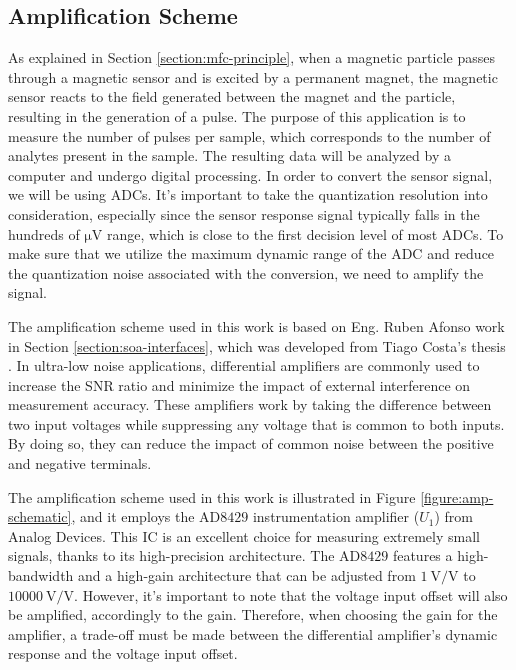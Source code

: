 \subsection{Amplification Scheme}

As explained in Section \ref{section:mfc-principle}, when a magnetic particle passes through a magnetic sensor and is excited by a permanent magnet, the magnetic sensor reacts to the field generated between the magnet and the particle, resulting in the generation of a pulse. The purpose of this application is to measure the number of pulses per sample, which corresponds to the number of analytes present in the sample. The resulting data will be analyzed by a computer and undergo digital processing. In order to convert the sensor signal, we will be using \ac{ADC}s. It's important to take the quantization resolution into consideration, especially since the sensor response signal typically falls in the hundreds of $\mathrm{\mu V}$ range, which is close to the first decision level of most \ac{ADC}s. To make sure that we utilize the maximum dynamic range of the \ac{ADC} and reduce the quantization noise associated with the conversion, we need to amplify the signal.

The amplification scheme used in this work is based on Eng. Ruben Afonso work in Section \ref{section:soa-interfaces}, which was developed from Tiago Costa's thesis \cite{TiagoC_thesis}. In ultra-low noise applications, differential amplifiers are commonly used to increase the \ac{SNR} ratio and minimize the impact of external interference on measurement accuracy. These amplifiers work by taking the difference between two input voltages while suppressing any voltage that is common to both inputs. By doing so, they can reduce the impact of common noise between the positive and negative terminals.

The amplification scheme used in this work is illustrated in Figure \ref{figure:amp-schematic}, and it employs the $\mathrm{AD8429}$ instrumentation amplifier ($U_1$) from Analog Devices. This \ac{IC} is an excellent choice for measuring extremely small signals, thanks to its high-precision architecture. The $\mathrm{AD8429}$ features a high-bandwidth and a high-gain architecture that can be adjusted from $\mathrm{1~V/V}$ to $\mathrm{10000~V/V}$. However, it's important to note that the voltage input offset will also be amplified, accordingly to the gain. Therefore, when choosing the gain for the amplifier, a trade-off must be made between the differential amplifier's dynamic response and the voltage input offset.

